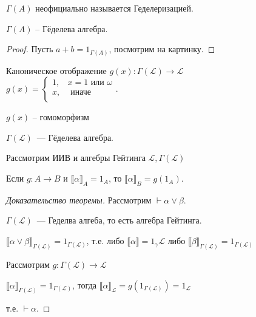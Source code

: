 \begin{remark}
    $\Gamma (A)$ неофициально называется Геделеризацией.
\end{remark}

\begin{theorem}
  $\Gamma(A)$ -- Гёделева алгебра.
\end{theorem}
\begin{proof}
    Пусть $a+b = 1_{\Gamma(A)}$, посмотрим на картинку.
\end{proof}

\begin{definition}
    Каноническое отображение $g(x): \Gamma(\mathcal L) \to \mathcal L$\\
    $g(x) = \begin{cases}
        1,& x = 1 \text{ или } \omega\\
        x,& \text{ иначе}\\
    \end{cases} $.
\end{definition}
\begin{statement}
        $g(x)$ -- гомоморфизм
\end{statement}

\begin{statement}
    $\Gamma(\mathcal L)$~--- Гёделева алгебра.
\end{statement}

\begin{theorem}
    Рассмотрим ИИВ и алгебры Гейтинга $\mathcal L, \Gamma (\mathcal{L})$
\end{theorem}

\begin{statement}
    Если $g: A \to B$ и $\llbracket\alpha\rrbracket_A = 1_A$, то
    $\llbracket \alpha \rrbracket_B = g(1_A)$.
\end{statement}


\begin{proof}[Доказательство теоремы]

    Рассмотрим $\vdash \alpha \vee \beta$.

    $\Gamma (\mathcal L)$~--- Геделва алгеба, то есть алгебра Гейтинга.

    $\llbracket \alpha \lor \beta \rrbracket_{\Gamma(\mathcal L)} = 1_{\Gamma(\mathcal L)}$,
    т.е. либо $\llbracket \alpha \rrbracket =1_\gamma{\mathcal L}$ либо $\llbracket \beta \rrbracket _{\Gamma(\mathcal L)} = 1_{\Gamma(\mathcal L)}$

    Рассмотрим $g : \Gamma(\mathcal{L}) \to \mathcal{L}$

    $\llbracket \alpha \rrbracket _{\Gamma(\mathcal L )} = 1_{\Gamma(\mathcal L)}$, тогда $\llbracket \alpha \rrbracket _{\mathcal L} = g(1_{\Gamma(\mathcal L)}) = 1_{\mathcal L}$

    т.е. $\vdash \alpha$.
\end{proof}

